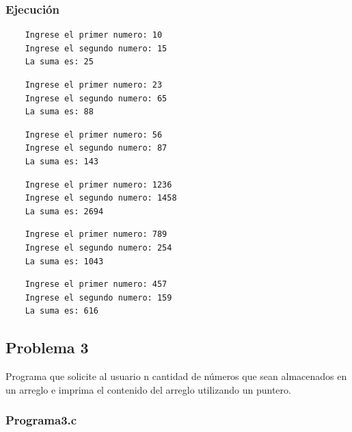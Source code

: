 \documentclass{article}
\begin{document}
	\subsubsection{Ejecución}
	
	\begin{lstlisting}
	Ingrese el primer numero: 10
	Ingrese el segundo numero: 15
	La suma es: 25
	\end{lstlisting}
	
	\begin{lstlisting}
	Ingrese el primer numero: 23
	Ingrese el segundo numero: 65
	La suma es: 88
	\end{lstlisting}
	
	\begin{lstlisting}
	Ingrese el primer numero: 56
	Ingrese el segundo numero: 87
	La suma es: 143
	\end{lstlisting}
	
	\begin{lstlisting}
	Ingrese el primer numero: 1236
	Ingrese el segundo numero: 1458
	La suma es: 2694
	\end{lstlisting}
	
	\begin{lstlisting}
	Ingrese el primer numero: 789
	Ingrese el segundo numero: 254 
	La suma es: 1043
	\end{lstlisting}
	
	\begin{lstlisting}
	Ingrese el primer numero: 457
	Ingrese el segundo numero: 159
	La suma es: 616
	\end{lstlisting}
	
	\newpage
	
	\subsection{Problema 3}
	
	Programa que solicite al usuario n cantidad de números que sean almacenados en un arreglo e imprima el contenido del arreglo utilizando un puntero.
	
	\subsubsection{Programa3.c}
	
\end{document}
